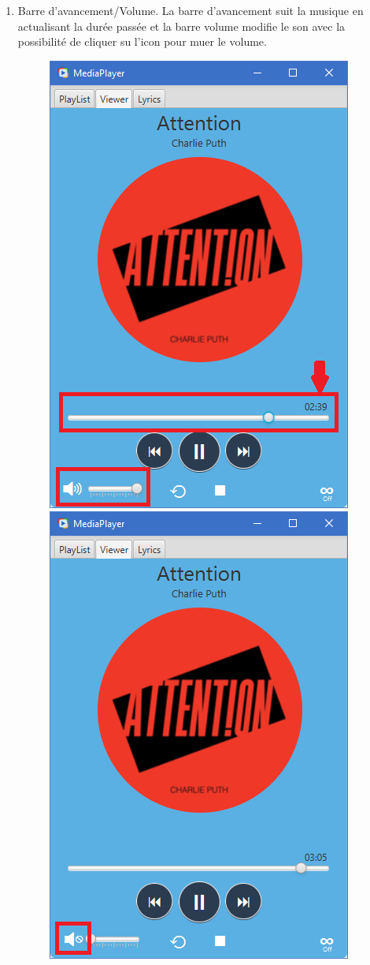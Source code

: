 \documentclass[a4paper,12pt]{report} %
\begin{document}
\begin{enumerate}
		\item Barre d'avancement/Volume. La barre d'avancement suit la musique en actualisant la durée passée et la barre volume modifie le son avec la possibilité de cliquer su l'icon pour muer le volume.
   			\begin{figure}[ht] 		
				\centering
  				\includegraphics[scale=0.6]{slider}
  				\hspace{5mm}
  				\includegraphics[scale=0.6]{mute}
			\end{figure} 
		

\end{enumerate}
\end{document}
